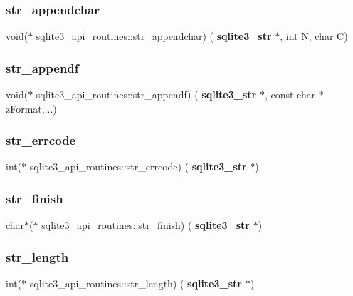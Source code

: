 \subsubsection{str\_appendchar}
{\footnotesize\ttfamily void($\ast$ sqlite3\+\_\+api\+\_\+routines\+::str\+\_\+appendchar) (\textbf{ sqlite3\+\_\+str} $\ast$, int N, char C)}

\mbox{\label{structsqlite3__api__routines_ac90b97807313ecf9010f8a9e6585cd9b}} 
\subsubsection{str\_appendf}
{\footnotesize\ttfamily void($\ast$ sqlite3\+\_\+api\+\_\+routines\+::str\+\_\+appendf) (\textbf{ sqlite3\+\_\+str} $\ast$, const char $\ast$z\+Format,...)}

\mbox{\label{structsqlite3__api__routines_a7077992319949b759d076af0764607b3}} 
\subsubsection{str\_errcode}
{\footnotesize\ttfamily int($\ast$ sqlite3\+\_\+api\+\_\+routines\+::str\+\_\+errcode) (\textbf{ sqlite3\+\_\+str} $\ast$)}

\mbox{\label{structsqlite3__api__routines_afcc9b29865d763cf0c0a560d33b76467}} 
\subsubsection{str\_finish}
{\footnotesize\ttfamily char$\ast$($\ast$ sqlite3\+\_\+api\+\_\+routines\+::str\+\_\+finish) (\textbf{ sqlite3\+\_\+str} $\ast$)}

\mbox{\label{structsqlite3__api__routines_acd8dfa17758d89f9cf458675ade84c63}} 
\subsubsection{str\_length}
{\footnotesize\ttfamily int($\ast$ sqlite3\+\_\+api\+\_\+routines\+::str\+\_\+length) (\textbf{ sqlite3\+\_\+str} $\ast$)}

